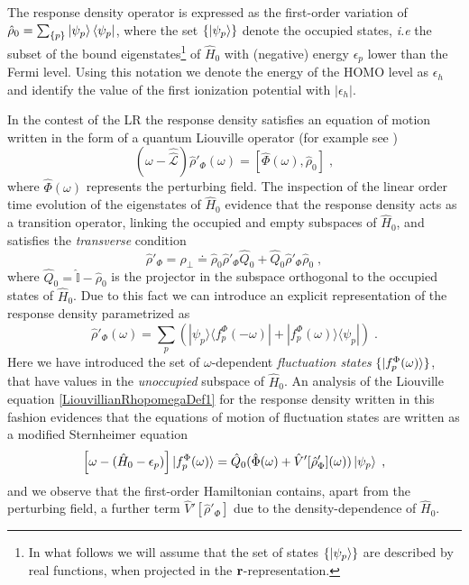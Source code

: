 \documentclass[reprint,aps,prb]{revtex4-1}
\renewcommand{\r}{{\bf r}}
\newcommand{\eps}{\epsilon}
\newcommand{\be}{\begin{equation}}
\newcommand{\ee}{\end{equation}}
\newcommand{\lb}{\label}
\newcommand{\op}[1]{\hat {#1}}
\newcommand{\sop}[1]{\op{\op {#1}}}
\newcommand{\commutator}[2]{\left[ {#1} , {#2} \right]}
\newcommand{\ketbra}[2]{| #1 \rangle \langle #2 |}
\newcommand{\dmnot}{\op{\rho}_0}
\newcommand{\dm}{\op{\rho}}
\newcommand{\hnot}{\op{H}_0}
\newcommand{\Liouv}{\sop{\mathcal L}}
\newcommand{\identity}{\op{\mathbb I}}
\begin{document}
\label{FluctuationState}

The response density operator is expressed as the first-order variation of $\dmnot=\sum_{\{p\}} \ket{\psi_p} \bra{\psi_p}$, where the set $\{\ket{\psi_p}\}$ denote the 
occupied states, \emph{i.e} the subset of the bound eigenstates\footnote{In what follows we will assume that the set of states $\{\ket{\psi_p}\}$ are described by real 
functions, when projected in the $\r$-representation.} of $\hnot$ with (negative) energy $\eps_p$ lower than the Fermi level. Using this notation we denote the energy of the HOMO level 
as $\eps_h$ and identify the value of the first ionization potential with $|\eps_h|$. 

In the contest of the LR the response density satisfies an equation of motion written in the form of a quantum Liouville operator (for example see \cite{baroni2008})
\be\lb{LiouvillianRhopomegaDef1}
\left(\omega - \Liouv\right) \dm'_\Phi(\omega) =  \commutator{\op\Phi(\omega)}{\dmnot} \;,
\ee
where $\op\Phi(\omega)$ represents the perturbing field. 
The inspection of the linear order time evolution of the eigenstates of $\hnot$ evidence that the response density acts as a transition 
operator, linking the occupied and empty subspaces of $\hnot$, and satisfies the \emph{transverse} condition  
\be\lb{RhopTransverseDef1}
\dm'_\Phi = \dm_{\perp} \doteq \dmnot\dm'_\Phi\op Q_0 + \op Q_0\dm'_\Phi\dmnot \;,
\ee
where $\op Q_0=\identity-\dmnot$ is the projector in the subspace orthogonal to the occupied states of $\hnot$. 
Due to this fact we can introduce an explicit representation of the 
response density parametrized as
\be\lb{rhoPrimeFluctuationStateDef1}
\dm'_\Phi(\omega) = \sum_p\left(\ketbra{\psi_p}{f_p^\Phi(-\omega)} + \ketbra{f_p^\Phi(\omega)}{\psi_p}\right) \;.
\ee
Here we have introduced the set of $\omega$-dependent \emph{fluctuation states} $\{\ket{f_p^\Phi(\omega)}\}$, 
that have values in the \emph{unoccupied} subspace of $\hnot$. 
An analysis of the Liouville equation \eqref{LiouvillianRhopomegaDef1} for the response density written in this fashion evidences that the equations of motion of fluctuation states are 
written as a modified Sternheimer equation~\cite{mahan1980}
\be\lb{fluctuationStateEqMotion1}
\left[\omega - (\hnot-\eps_p)\right]\ket{f_p^\Phi(\omega)} = \op Q_0(\op\Phi(\omega)+\op V'[\dm'_\Phi](\omega))\ket{\psi_p} \;,
\ee
and we observe that the first-order Hamiltonian contains, 
apart from the perturbing field, a further term $\op V'[\dm'_\Phi]$ due to the density-dependence of $\hnot$.
\end{document}
